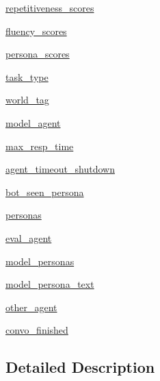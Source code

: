 \begin{DoxyCompactItemize}
\item 
\hyperlink{classmturk_1_1worlds_1_1ControllableDialogEval_acd1de7afc76429815ca977cd85c399f1}{repetitiveness\+\_\+scores}
\item 
\hyperlink{classmturk_1_1worlds_1_1ControllableDialogEval_ac7a2b215fda842a612f96fcd1cc0296f}{fluency\+\_\+scores}
\item 
\hyperlink{classmturk_1_1worlds_1_1ControllableDialogEval_a1cc5fc73eb42f3b7d06027da9d71eb9f}{persona\+\_\+scores}
\item 
\hyperlink{classmturk_1_1worlds_1_1ControllableDialogEval_af7f2f53cc5c6aca907732e365f6cb06e}{task\+\_\+type}
\item 
\hyperlink{classmturk_1_1worlds_1_1ControllableDialogEval_a05c72f3704bab687338db610729a0611}{world\+\_\+tag}
\item 
\hyperlink{classmturk_1_1worlds_1_1ControllableDialogEval_afe2c2b1b1a788d5e57d9bf155e35da5d}{model\+\_\+agent}
\item 
\hyperlink{classmturk_1_1worlds_1_1ControllableDialogEval_adcb6a5fb174ba82acc3229cc648dbfae}{max\+\_\+resp\+\_\+time}
\item 
\hyperlink{classmturk_1_1worlds_1_1ControllableDialogEval_a53c001c4f6690abc729f5490d6aee0e6}{agent\+\_\+timeout\+\_\+shutdown}
\item 
\hyperlink{classmturk_1_1worlds_1_1ControllableDialogEval_ae4cd1f55048ec15100183ba033d7e962}{bot\+\_\+seen\+\_\+persona}
\item 
\hyperlink{classmturk_1_1worlds_1_1ControllableDialogEval_affdb463b4e65d8444fda2fde560357a9}{personas}
\item 
\hyperlink{classmturk_1_1worlds_1_1ControllableDialogEval_ad3e4eae70dc3edfddaf2d2e533850f0b}{eval\+\_\+agent}
\item 
\hyperlink{classmturk_1_1worlds_1_1ControllableDialogEval_a384294842ce53b414f3f1c2990210d1c}{model\+\_\+personas}
\item 
\hyperlink{classmturk_1_1worlds_1_1ControllableDialogEval_a2c5718084fcc79c34b54a80a2e01d635}{model\+\_\+persona\+\_\+text}
\item 
\hyperlink{classmturk_1_1worlds_1_1ControllableDialogEval_a62b5e5cb5d65845223a6900a50ea9029}{other\+\_\+agent}
\item 
\hyperlink{classmturk_1_1worlds_1_1ControllableDialogEval_ac7241d7190341c8c85298c13190a556f}{convo\+\_\+finished}
\end{DoxyCompactItemize}


\subsection{Detailed Description}


